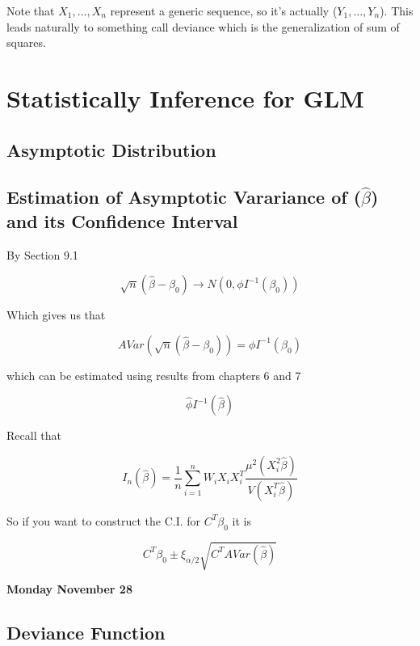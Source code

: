 \documentclass[11pt,fleqn]{book} %
\begin{document}
Note that $X_1, \dots, X_n$ represent a generic sequence, so it's actually ($Y_1, \dots, Y_n$). This leads naturally to something call deviance which is the generalization of sum of squares. 



\chapter{Statistically Inference for GLM}

\section{Asymptotic Distribution}

\section{Estimation of Asymptotic Varariance of ($\hat{\beta}$) and its Confidence Interval}

By Section 9.1 

		$$\sqrt{n}(\hat{\beta} - \beta_0) \rightarrow N(0, \phi I^{-1}(\beta_0))$$

Which gives us that

		$$AVar(\sqrt{n}(\hat{\beta} - \beta_0)) = \phi I^{-1}(\beta_0) $$

which can be estimated using results from chapters 6 and 7

		$$\hat{\phi} I^{-1}(\hat{\beta}) $$

Recall that

		$$I_n(\hat{\beta}) = \frac{1}{n} \sum^n_{i=1} W_i X_i X_i^T \frac{\mu^2(X_i^2 \hat{\beta})}{V(X_i^T \hat{\beta})} $$

So if you want to construct the C.I. for $C^T \beta_0$ it is

		$$ C^T \beta_0 \pm \xi_{\alpha/2} \sqrt{C^T AVar(\hat{\beta})}$$

		

\textbf{Monday November 28}\\

\section{Deviance Function}
\end{document}
